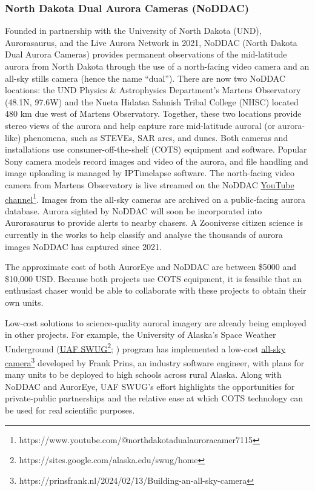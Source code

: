 \documentclass{article}
\renewcommand{\cite}[1]{\parencite{#1}}
\begin{document}
\subsubsection{North Dakota Dual Aurora Cameras (NoDDAC)}

Founded in partnership with the University of North Dakota (UND), Aurorasaurus, and the Live Aurora Network in 2021, NoDDAC (North Dakota Dual Aurora Cameras) provides permanent observations of the mid-latitude aurora from North Dakota through the use of a north-facing video camera and an all-sky stills camera (hence the name ``dual''). There are now two NoDDAC locations: the UND Physics \& Astrophysics Department's Martens Observatory (48.1\textdegree N, 97.6\textdegree W) and the Nueta Hidatsa Sahnish Tribal College (NHSC) located 480 km due west of Martens Observatory. Together, these two locations provide stereo views of the aurora and help capture rare mid-latitude auroral (or aurora-like) phenomena, such as STEVEs, SAR arcs, and dunes. Both cameras and installations use consumer-off-the-shelf (COTS) equipment and software. Popular Sony camera models record images and video of the aurora, and file handling and image uploading is managed by IPTimelapse software. The north-facing video camera from Martens Observatory is live streamed on the NoDDAC \href{https://www.youtube.com/@northdakotadualauroracamer7115}{YouTube channel}\footnote{https://www.youtube.com/@northdakotadualauroracamer7115}. Images from the all-sky cameras are archived on a public-facing aurora database. Aurora sighted by NoDDAC will soon be incorporated into Aurorasaurus to provide alerts to nearby chasers. A Zooniverse citizen science is currently in the works to help classify and analyse the thousands of aurora images NoDDAC has captured since 2021.

The approximate cost of both AurorEye and NoDDAC are between \$5000 and \$10,000 USD. Because both projects use COTS equipment, it is feasible that an enthusiast chaser would be able to collaborate with these projects to obtain their own units.

Low-cost solutions to science-quality auroral imagery are already being employed in other projects. For example, the University of Alaska's Space Weather Underground (\href{https://sites.google.com/alaska.edu/swug/home}{UAF SWUG}\footnote{https://sites.google.com/alaska.edu/swug/home}; \cite{cohen2024}) program has implemented a low-cost \href{https://prinsfrank.nl/2024/02/13/Building-an-all-sky-camera}{all-sky camera}\footnote{https://prinsfrank.nl/2024/02/13/Building-an-all-sky-camera} developed by Frank Prins, an industry software engineer, with plans for many units to be deployed to high schools across rural Alaska. Along with NoDDAC and AurorEye, UAF SWUG's effort highlights the opportunities for private-public partnerships and the relative ease at which COTS technology can be used for real scientific purposes.
\end{document}
